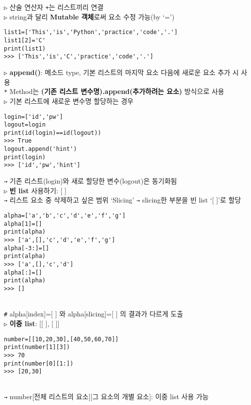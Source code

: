 \documentclass[11pt,a4paper]{article}
\begin{document}
\begin{spacing}{1.5}
\texttt{▷} 산술 연산자 \texttt{+}는 리스트끼리 연결\\

\texttt{▷} string과 달리 \textbf{Mutable 객체}로써 요소 수정 가능(by `=')
\begin{lstlisting}[label={list:first}]
list1=['This','is','Python','practice','code','.']
list1[2]='C'
print(list1)
>>> ['This','is','C','practice','code','.']
\end{lstlisting}

\texttt{▷} \textbf{append()}: 메소드 type, 기본 리스트의 마지막 요소 다음에 새로운 요소 추가 시 사용\\
\hspace*{2em}\texttt{*} Method는 \textbf{(기존 리스트 변수명).append(추가하려는 요소)} 방식으로 사용\\

\texttt{▷} 기본 리스트에 새로운 변수명 할당하는 경우
\begin{lstlisting}[label={list:first}]
login=['id','pw']
logout=login
print(id(login)==id(logout))
>>> True
logout.append('hint')
print(login)
>>> ['id','pw','hint']
\end{lstlisting}
\texttt{→} 기존 리스트(login)와 새로 할당한 변수(logout)은 동기화됨\\

\texttt{▷} \textbf{빈 list} 사용하기: [ ]\\
\texttt{→} 리스트 요소 중 삭제하고 싶은 범위 `Slicing' \texttt{→} slicing한 부분을 빈 list `[ ]'로 할당
\begin{lstlisting}[label={list:first}]
alpha=['a','b','c','d','e','f','g']
alpha[1]=[]
print(alpha)
>>> ['a',[],'c','d','e','f','g']
alpha[-3:]=[]
print(alpha)
>>> ['a',[],'c','d']
alpha[:]=[]
print(alpha)
>>> []
\end{lstlisting}\\
\verb|#| alpha[index]=[ ] 와 alpha[slicing]=[ ] 의 결과가 다르게 도출\\

\texttt{▷} \textbf{이중 list}: [[     ], [     ]]
\begin{lstlisting}[label={list:first},caption=이중 리스트문]
number=[[10,20,30],[40,50,60,70]]
print(number[1][3])
>>> 70
print(number[0][1:])
>>> [20,30]
\end{lstlisting}\\
\texttt{→} number[전체 리스트의 요소][그 요소의 개별 요소]: 이중 list 사용 가능\\


\end{spacing}
\end{document}
